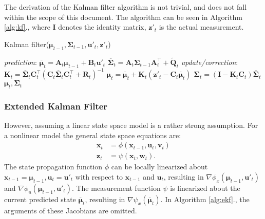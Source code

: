 The derivation of the Kalman filter algorithm is not trivial, and does not fall within the scope of this document. The algorithm can be seen in Algorithm \ref{alg:kf}., where $\mathbf{I}$ denotes the identity matrix, $\mathbf{z}'_t$ is the actual measurement.

\begin{algorithm}
    \caption{Kalman filter($\boldsymbol{\mu}_{t-1},\mathbf{\Sigma}_{t-1},\mathbf{u}'_t,\mathbf{z}'_t$)}\label{alg:kf}
    \begin{algorithmic}[1]
        \BState \emph{prediction}:
        \State\indent$\overline{\boldsymbol{\mu}}_t = \mathbf{A}_t{\boldsymbol{\mu}}_{t-1} + \mathbf{B}_t\mathbf{u}'_t$
        \State\indent $\overline{\mathbf{\Sigma}}_t = \mathbf{A}_t\mathbf{\Sigma}_{t-1}\mathbf{A}^\top_t + \tilde{\mathbf{Q}}_t$
        \BState \emph{update/correction}:
        \State\indent $\mathbf{K}_t = \overline{\mathbf{\Sigma}}_t\mathbf{C}_t^\top\left(\mathbf{C}_t\overline{\mathbf{\Sigma}}_t\mathbf{C}_t^\top+\mathbf{R}_t\right)^{-1}$
        \State\indent $\boldsymbol{\mu}_t = \overline{\boldsymbol{\mu}}_t + \mathbf{K}_t\left(\mathbf{z}'_t-\mathbf{C}_t\overline{\boldsymbol{\mu}}_t\right)$
        \State\indent $\mathbf{\Sigma}_t = \left(\mathbf{I}-\mathbf{K}_t\mathbf{C}_t\right)\overline{\mathbf{\Sigma}}_t$
        \State\Return $\boldsymbol{\mu}_t,\mathbf{\Sigma}_t$
    \end{algorithmic}
\end{algorithm}
\subsubsection{Extended Kalman Filter}
However, assuming a linear state space model is a rather strong assumption. For a nonlinear model the general state space equations are:
\begin{align}
    \mathbf{x}_t & = \phi(\mathbf{x}_{t-1},\mathbf{u}_t,\mathbf{v}_t) \label{eq:explicit-mot-eq} \\
    \mathbf{z}_t & = \psi(\mathbf{x}_t,\mathbf{w}_t).  \label{eq:explicit-meas-eq}
\end{align}
The state propagation function $\phi$ can be locally linearized about $\mathbf{x}_{t-1} = \boldsymbol{\mu}_{t-1}, \mathbf{u}_t = \mathbf{u}'_t$ with respect to $\mathbf{x}_{t-1}$ and $\mathbf{u}_t$, resulting in $\nabla \phi _x(\boldsymbol{\mu}_{t-1},\mathbf{u}'_t)$ and $\nabla \phi_u(\boldsymbol{\mu}_{t-1},\mathbf{u}'_t)$.
The measurement function $\psi$ is linearized about the current predicted state $\overline{\boldsymbol{\mu}}_t$,
resulting in $\nabla \psi_x(\overline{\boldsymbol{\mu}}_t)$.
In Algorithm \ref{alg:ekf}., the arguments of these Jacobians are omitted.

